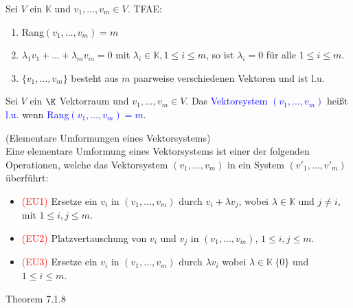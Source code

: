 \begin{theorem}
Sei $V$ ein $\mathbb{K}$ und $v_1,\dots,v_m \in V$. TFAE:
\begin{enumerate}
    \item Rang$(v_1,\dots,v_m) = m$
    \item $\lambda_1v_1+\dots+\lambda_{m}v_m = 0$ mit $\lambda_i \in\mathbb{K}, 1 \leq i \leq m$, so ist $\lambda_i = 0$ für alle $1 \leq i \leq m$.
    \item $\{v_1,\dots,v_m\}$ besteht aus $m$ paarweise verschiedenen Vektoren und ist l.u.
\end{enumerate}
\end{theorem}
\begin{theorem}
Sei $V$ ein $\K$ Vektorraum und $v_1,\dots,v_m \in V$. Das \textcolor{blue}{Vektorsystem $(v_1,\dots,v_m)$} heißt \textcolor{blue}{l.u.} wenn \textcolor{blue}{Rang$(v_1,\dots,v_m) = m$}.
\end{theorem}
\begin{definition}(Elementare Umformungen eines Vektorsystems)\\
Eine elementare Umformung eines Vektorsystems ist einer der folgenden Operationen, welche das Vektorsystem $(v_1,\dots,v_m)$ in ein System $(v'_1,\dots,v'_m)$ überführt:
\begin{itemize}
\item \textcolor{red}{(EU1)}   Ersetze ein $v_i$ in $(v_1,\dots,v_m)$ durch $v_i + \lambda v_j$, wobei $\lambda \in \mathbb{K}$ und $j \neq i$, mit $1 \leq i, j \leq m$.
\item \textcolor{red}{(EU2)}  Platzvertauschung von $v_i$ und $v_j$ in $(v_1,\dots,v_m)$, $1 \leq i, j \leq m$.
\item \textcolor{red}{(EU3)}  Ersetze ein $v_i$ in $(v_1,\dots,v_m)$ durch $\lambda v_i$ wobei $\lambda \in \mathbb{K}\ \{0\}$ und $1 \leq i \leq m$.
\end{itemize}
\end{definition}
\begin{theorem}
Theorem 7.1.8
\end{theorem}
